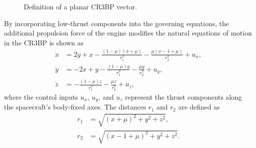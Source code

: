 \documentclass[conference]{IEEEtran}
\begin{document}
\begin{figure}[H]
{}
	\caption{Definition of a planar CR3BP vector.}\label{fig:CR3BP}
\end{figure}


 By incorporating low-thrust components into the governing equations, the additional propulsion force of the engine modifies the natural equations of motion in the CR3BP is shown as
\begin{align}
		\ddot{x} &= 2\dot{y} + x - \frac{(1-\mu)(x+\mu)}{r_1^3} - \frac{\mu(x-1+\mu)}{r_2^3} + u_x, \\
		\ddot{y} &= -2\dot{x} + y - \frac{(1-\mu)y}{r_1^3} - \frac{\mu y}{r_2^3} + u_y, \\
		\ddot{z} &= -\frac{(1-\mu)z}{r_1^3} - \frac{\mu z}{r_2^3} + u_z,
\end{align}
where the control inputs \( u_x \), \( u_y \), and \( u_z \) represent the thrust components along the spacecraft's body-fixed axes. The distances \( r_1 \) and \( r_2 \) are defined as
\begin{align}
	r_1 &= \sqrt{(x+\mu)^2 + y^2 + z^2}, \\
	r_2 &= \sqrt{(x-1+\mu)^2 + y^2 + z^2}.
\end{align}
\end{document}
